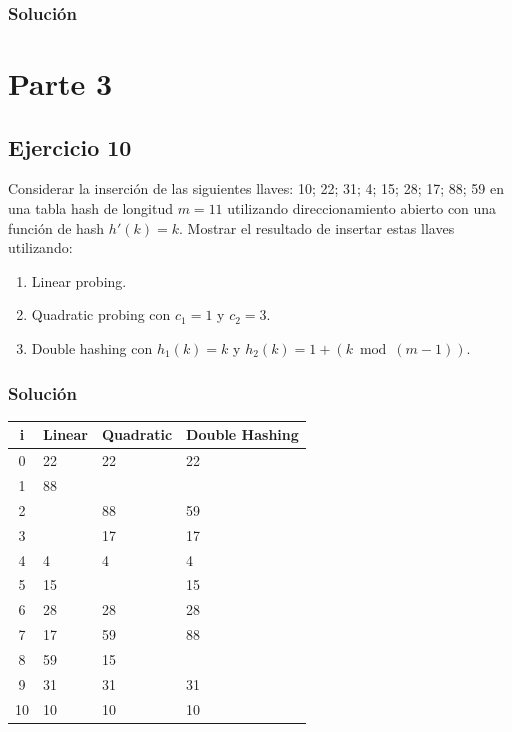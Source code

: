 \documentclass{article}
\begin{document}
\subsubsection*{Solución}


\section*{Parte 3}
\subsection*{Ejercicio 10}
Considerar la inserción de las siguientes llaves: 10; 22; 31; 4; 15; 28; 17; 88; 59 en una tabla hash de longitud $m = 11$ utilizando direccionamiento abierto con una función de hash $h'(k) = k$. Mostrar el resultado de insertar estas llaves utilizando:
\begin{enumerate}
    \item Linear probing.
    \item Quadratic probing con $c_1 = 1$ y $c_2 = 3$.
    \item Double hashing con $h_1(k) = k$ y $h_2(k) = 1 +(k \bmod ( m - 1))$.
\end{enumerate}
\subsubsection*{Solución}
\begin{center}
\begin{tabular}{|c|l|l|l|}
    \hline
    i  & Linear & Quadratic & Double Hashing \\ \hline
    0  & 22     & 22        & 22             \\ \hline
    1  & 88     &           &                \\ \hline
    2  &        & 88        & 59             \\ \hline
    3  &        & 17        & 17             \\ \hline
    4  & 4      & 4         & 4              \\ \hline
    5  & 15     &           & 15             \\ \hline
    6  & 28     & 28        & 28             \\ \hline
    7  & 17     & 59        & 88             \\ \hline
    8  & 59     & 15        &                \\ \hline
    9  & 31     & 31        & 31             \\ \hline
    10 & 10     & 10        & 10             \\ \hline
\end{tabular}
\end{center}
\end{document}
